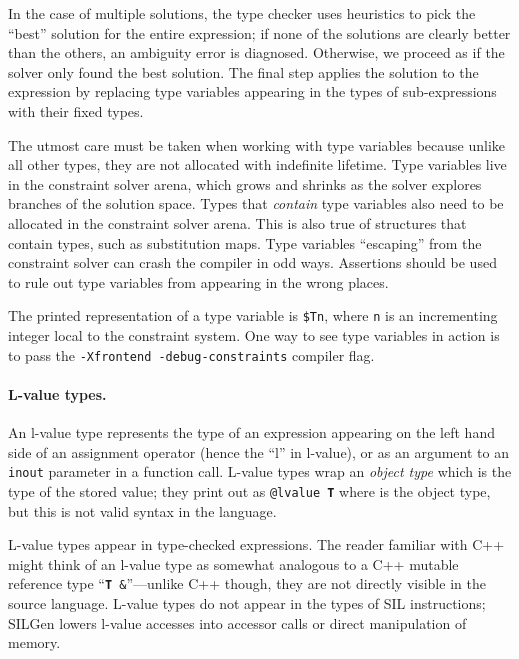 \documentclass[../generics]{subfiles}
\begin{document}
In the case of multiple solutions, the type checker uses heuristics to pick the ``best'' solution for the entire expression; if none of the solutions are clearly better than the others, an ambiguity error is diagnosed. Otherwise, we proceed as if the solver only found the best solution. The final step applies the solution to the expression by replacing type variables appearing in the types of sub-expressions with their fixed types.

The utmost care must be taken when working with type variables because unlike all other types, they are not allocated with indefinite lifetime. Type variables live in the constraint solver arena, which grows and shrinks as the solver explores branches of the solution space. Types that \emph{contain} type variables also need to be allocated in the constraint solver arena. This is also true of structures that contain types, such as substitution maps. Type variables ``escaping'' from the constraint solver can crash the compiler in odd ways. Assertions should be used to rule out type variables from appearing in the wrong places.

The printed representation of a type variable is \texttt{\$Tn}, where \texttt{n} is an incrementing integer local to the constraint system. One way to see type variables in action is to pass the \texttt{-Xfrontend~-debug-constraints} compiler flag.

\paragraph{L-value types.}
An l-value type represents the type of an expression appearing on the left hand side of an assignment operator (hence the ``l'' in l-value), or as an argument to an \texttt{inout} parameter in a function call. L-value types wrap an \emph{object type} which is the type of the stored value; they print out as \texttt{@lvalue~\textbf{T}} where  is the object type, but this is not valid syntax in the language.

L-value types appear in type-checked expressions. The reader familiar with C++ might think of an l-value type as somewhat analogous to a C++ mutable reference type ``\texttt{\textbf{T}~\&}''---unlike C++ though, they are not directly visible in the source language. L-value types do not appear in the types of SIL instructions; SILGen lowers l-value accesses into accessor calls or direct manipulation of memory.
\end{document}
